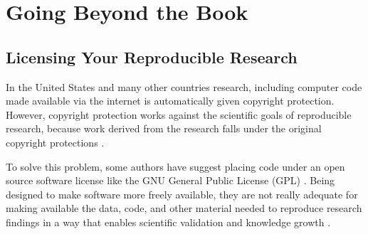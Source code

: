



\chapter{Going Beyond the Book}\label{FinalChapter}


\section{Licensing Your Reproducible Research}

In the United States and many other countries research, including computer code made available via the internet is automatically given copyright protection. However, copyright protection works against the scientific goals of reproducible research, because work derived from the research falls under the original copyright protections \cite[36]{Stodden2009}. 

To solve this problem, some authors have suggest placing code under an open source software license like the GNU General Public License (GPL) \cite[]{Vandewalle2007}. Being designed to make software more freely available, they are not really adequate for making available the data, code, and other material needed to reproduce research findings in a way that enables scientific validation and knowledge growth \cite[see][]{Stodden2009}. 

